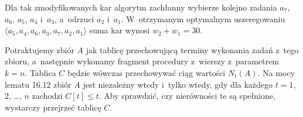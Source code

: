 
\exercise %
Dla tak zmodyfikowanych kar algorytm zachłanny wybierze kolejno zadania $a_7$, $a_6$, $a_5$, $a_4$ i~$a_3$, a~odrzuci $a_2$ i~$a_1$.
W~otrzymanym optymalnym uszeregowaniu $\langle a_5,a_4,a_6,a_3,a_7,a_2,a_1\rangle$ suma kar wynosi $w_2+w_1=30$.

\exercise %
Potraktujemy zbiór $A$ jak tablicę przechowującą terminy wykonania zadań z~tego zbioru, a~następnie wykonamy fragment procedury  z~wierszy  z~parametrem $k=n$.
Tablica $C$ będzie wówczas przechowywać ciąg wartości $N_t(A)$.
Na mocy lematu 16.12 zbiór $A$ jest niezależny wtedy i~tylko wtedy, gdy dla każdego $t=1$, 2, \dots, $n$ zachodzi $C[t]\le t$.
Aby sprawdzić, czy nierówności te są spełnione, wystarczy przejrzeć tablicę $C$.
